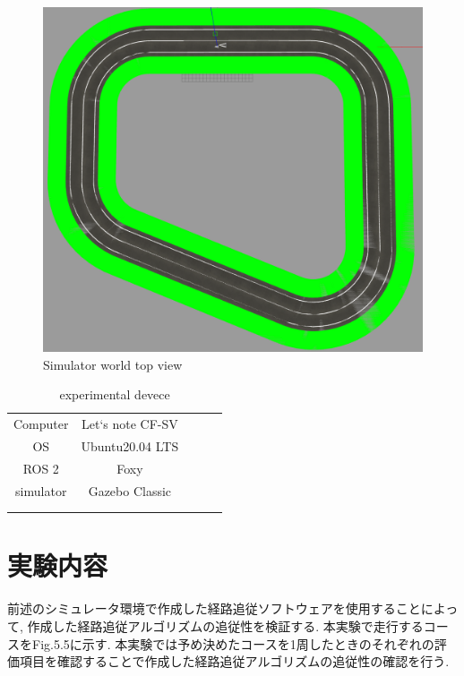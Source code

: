\begin{figure}[H]
  \centering
 \includegraphics[keepaspectratio, scale=0.3]
      {images/topviewsim.png}
 \caption{Simulator world top view}
 \label{fig:simulator}
\end{figure}

\begin{table}[H]
  \centering
  \caption{experimental devece}
  \begin{tabular}{cclll}
  \cline{1-2}
  Computer             & Let`s note CF-SV &  &  &  \\
  OS                   & Ubuntu20.04 LTS  &  &  &  \\
  ROS 2                & Foxy             &  &  &  \\
  simulator            & Gazebo Classic   &  &  &  \\
  \multicolumn{1}{l}{} &                  &  &  &  \\
  \multicolumn{1}{l}{} &                  &  &  & 
  \end{tabular}
\end{table}

\section{実験内容}
前述のシミュレータ環境で作成した経路追従ソフトウェアを使用することによって, 作成した経路追従アルゴリズムの追従性を検証する.
本実験で走行するコースをFig.5.5に示す.
本実験では予め決めたコースを1周したときのそれぞれの評価項目を確認することで作成した経路追従アルゴリズムの追従性の確認を行う.


